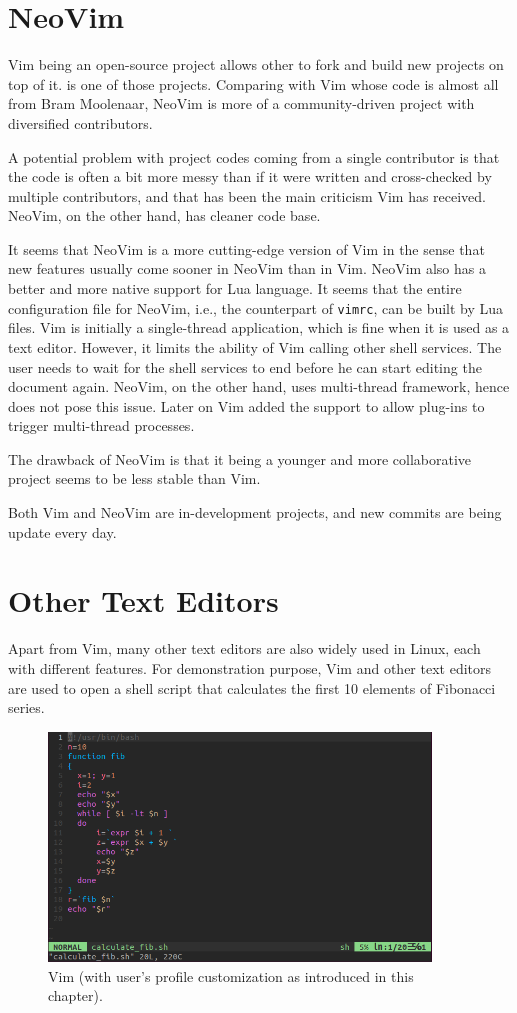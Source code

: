 \section{NeoVim}

Vim being an open-source project allows other to fork and build new projects on top of it.  is one of those projects. Comparing with Vim whose code is almost all from Bram Moolenaar, NeoVim is more of a community-driven project with diversified contributors. 

A potential problem with project codes coming from a single contributor is that the code is often a bit more messy than if it were written and cross-checked by multiple contributors, and that has been the main criticism Vim has received. NeoVim, on the other hand, has cleaner code base. 

It seems that NeoVim is a more cutting-edge version of Vim in the sense that new features usually come sooner in NeoVim than in Vim. NeoVim also has a better and more native support for Lua language. It seems that the entire configuration file for NeoVim, i.e., the counterpart of \verb|vimrc|, can be built by Lua files. Vim is initially a single-thread application, which is fine when it is used as a text editor. However, it limits the ability of Vim calling other shell services. The user needs to wait for the shell services to end before he can start editing the document again. NeoVim, on the other hand, uses multi-thread framework, hence does not pose this issue. Later on Vim added the support to allow plug-ins to trigger multi-thread processes.

The drawback of NeoVim is that it being a younger and more collaborative project seems to be less stable than Vim.

Both Vim and NeoVim are in-development projects, and new commits are being update every day. 

\section{Other Text Editors}

Apart from Vim, many other text editors are also widely used in Linux, each with different features. For demonstration purpose, Vim and other text editors are used to open a shell script that calculates the first 10 elements of Fibonacci series.

\begin{figure}[!htb]
	\centering
	\includegraphics[width=4in]{chapters/part-1/figures/vim_fib.png}
	\caption{Vim (with user's profile customization as introduced in this chapter).}
\end{figure}

